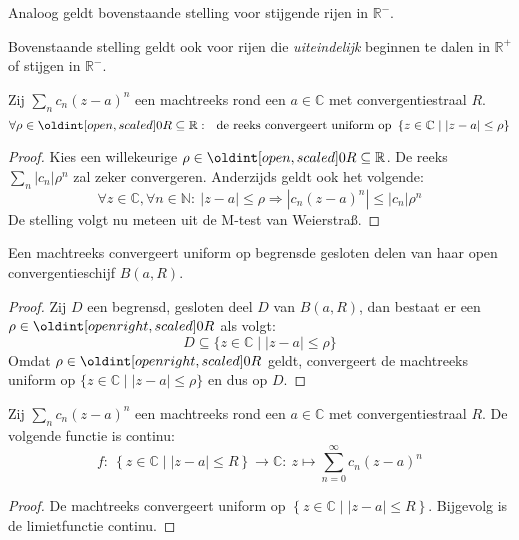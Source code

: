\documentclass[main.tex]{subfiles}
\begin{document}
\begin{opm}
  Analoog geldt bovenstaande stelling voor stijgende rijen in $\mathbb{R}^{-}$.
\end{opm}

\begin{opm}
  Bovenstaande stelling geldt ook voor rijen die \textit{uiteindelijk} beginnen te dalen in $\mathbb{R}^{+}$ of stijgen in $\mathbb{R}^{-}$.
\end{opm}

\begin{bst}
  \label{st:machtreeks-convergeert-uniform-op-open-convergentieschijf}
  Zij $\sum_{n}c_{n}(z-a)^{n}$ een machtreeks rond een $a\in \mathbb{C}$ met convergentiestraal $R$.
  \[ \forall \rho \in \interval[open]{0}{R} \subseteq \mathbb{R}:\ \text{ de reeks convergeert uniform op } \left\{ z \in \mathbb{C} \mid |z-a| \le \rho \right\} \]

  \begin{proof}
    Kies een willekeurige $\rho \in \interval[open]{0}{R} \subseteq \mathbb{R}$.
    De reeks $\sum_{n}|c_{n}|\rho^{n}$ zal zeker convergeren.
    Anderzijds geldt ook het volgende:
    \[ \forall z\in \mathbb{C}, \forall n\in \mathbb{N}:\ |z-a|\le \rho \Rightarrow |c_{n}(z-a)^{n}| \le |c_{n}|\rho^{n} \]
    De stelling volgt nu meteen uit de M-test van Weierstra\ss.
  \end{proof}
\end{bst}

\begin{gev}
  Een machtreeks convergeert uniform op begrensde gesloten delen van haar open convergentieschijf $B(a,R)$.
  \begin{proof}
    Zij $D$ een begrensd, gesloten deel $D$ van $B(a,R)$, dan bestaat er een $\rho \in \interval[open right]{0}{R}$ als volgt:
    \[ D \subseteq \{ z \in \mathbb{C} \mid |z-a| \le \rho \} \]
    Omdat $\rho \in \interval[open right]{0}{R}$ geldt, convergeert de machtreeks uniform op $\{ z \in \mathbb{C} \mid |z-a| \le \rho \}$ en dus op $D$.
  \end{proof}
\end{gev}

\begin{bgev}
  Zij $\sum_{n}c_{n}(z-a)^{n}$ een machtreeks rond een $a\in \mathbb{C}$ met convergentiestraal $R$.
  De volgende functie is continu:
  \[ f:\ \left\{ z \in \mathbb{C} \mid |z-a| \le R \right\} \rightarrow \mathbb{C}:\ z \mapsto \sum_{n=0}^{\infty}c_{n}(z-a)^{n}  \]

  \begin{proof}
    De machtreeks convergeert uniform op $\left\{ z \in \mathbb{C} \mid |z-a| \le R \right\}$.
    Bijgevolg is de limietfunctie continu.
  \end{proof}
\end{bgev}
\end{document}
